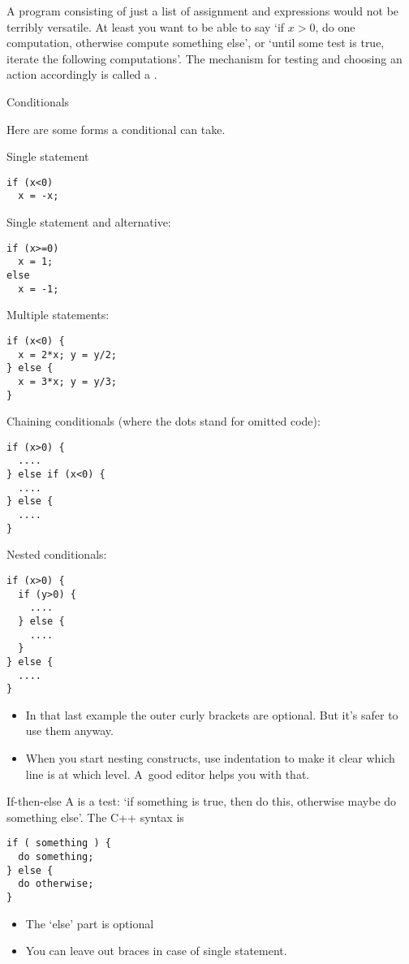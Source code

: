 
A program consisting of just a list of assignment and expressions
would not be terribly versatile. At least you want to be able to say
`if $x>0$, do one computation, otherwise compute something else', or `until some
test is true, iterate the following computations'. The mechanism for
testing and choosing an action accordingly is called a
.

 {Conditionals}
\label{sec:if}

Here are some forms a conditional can take.

Single statement
\begin{lstlisting}
if (x<0)
  x = -x;
\end{lstlisting}
Single statement and alternative:
\begin{lstlisting}
if (x>=0)
  x = 1;
else
  x = -1;
\end{lstlisting}
Multiple statements:
\begin{lstlisting}
if (x<0) {
  x = 2*x; y = y/2;
} else {
  x = 3*x; y = y/3;
}
\end{lstlisting}
Chaining conditionals (where the dots stand for omitted code):
\begin{lstlisting}
if (x>0) {
  ....
} else if (x<0) {
  ....
} else {
  ....
}
\end{lstlisting}
Nested conditionals:
\begin{lstlisting}
if (x>0) {
  if (y>0) {
    ....
  } else {
    ....
  }
} else {
  ....
}
\end{lstlisting}
\begin{itemize}
\item
  In that last example the outer curly brackets are optional. But it's
  safer to use them anyway.
\item When you start nesting constructs, use indentation to make it
  clear which line is at which level. A~good editor helps you with that.
\end{itemize}

\begin{slide}{If-then-else}
  \label{sl:ifthenelse}
  A  is a test: `if something is true, then do
  this, otherwise maybe do something else'. The C++ syntax is
\begin{lstlisting}
if ( something ) {
  do something;
} else {
  do otherwise;
}
\end{lstlisting}
\begin{itemize}
\item The `else' part is optional
\item You can leave out braces in case of single statement.
\end{itemize}
\end{slide}

